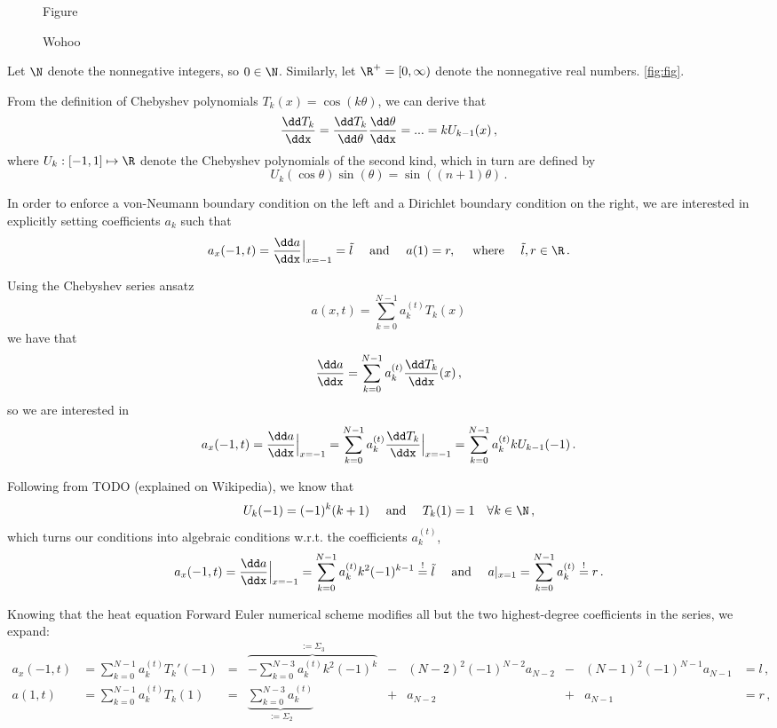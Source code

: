 \documentclass{prettytex/ox/mmsc-special-topic}
\begin{document}
  \pagebreak
  \pagestyle{normal}

  \begin{figure}[H]
    \centering
    Figure
    \caption{Wohoo}
    \label{fig:fig}
  \end{figure}

  Let $\N$ denote the nonnegative integers, so $0 \in \N$.
  Similarly, let $\R^+ = [0, \infty)$ denote the nonnegative real numbers.
  \autoref{fig:fig}.

  From the definition of Chebyshev polynomials $T_k(x) = \cos(k\theta)$, we can derive that
  $$\frac{\dd T_k}{\ddx} = \frac{\dd T_k}{\dd\theta} \frac{\dd\theta}{\ddx} = ... = k U_{k-1}(x)\,,$$
  where $U_k: [-1, 1] \mapsto \R$ denote the Chebyshev polynomials of the second kind, which in turn are defined by
  $$U_k(\cos \theta) \sin(\theta) = \sin\left((n+1) \theta\right)\,.$$

  In order to enforce a von-Neumann boundary condition on the left and a Dirichlet boundary condition on the right,
  we are interested in explicitly setting coefficients $a_k$ such that
  $$a_x(-1, t) = \frac{\dd a}{\ddx}\Big|_{x=-1} = \tilde{l} \quad \text{ and } \quad a(1) = r, \quad \text{ where } \quad \tilde{l}, r \in \R\,.$$

  Using the Chebyshev series ansatz
  $$a(x, t) = \sum_{k=0}^{N-1} a_k^{(t)} T_k(x)$$
  we have that
  $$\frac{\dd a}{\ddx} = \sum_{k=0}^{N-1} a_k^{(t)} \frac{\dd T_k}{\ddx}(x)\,,$$
  so we are interested in
  $$a_x(-1, t) = \frac{\dd a}{\ddx}\Big|_{x=-1} = \sum_{k=0}^{N-1} a_k^{(t)} \frac{\dd T_k}{\ddx}\Big|_{x=-1} = \sum_{k=0}^{N-1} a_k^{(t)} k U_{k-1}(-1)\,.$$

  Following from TODO (explained on Wikipedia), we know that
  $$U_k(-1) = (-1)^k (k+1) \quad \text{ and } \quad T_k(1) = 1 \quad \forall k \in \N\,,$$
  which turns our conditions into algebraic conditions w.r.t. the coefficients $a_k^{(t)}$,
  $$a_x(-1, t) = \frac{\dd a}{\ddx}\Big|_{x=-1} = \sum_{k=0}^{N-1} a_k^{(t)} k^2 (-1)^{k-1} \overset{!}{=} \tilde{l} \quad \text{ and } \quad a|_{x=1} = \sum_{k=0}^{N-1} a_k^{(t)} \overset{!}{=} r\,.$$

  Knowing that the heat equation Forward Euler numerical scheme modifies all but the two highest-degree coefficients in the series, we expand:
  \begin{align*}
    a_x(-1, t) & = \sum_{k=0}^{N-1} a_k^{(t)} T_k'(-1) & = & \overbrace{-\sum_{k=0}^{N-3} a_k^{(t)} k^2 (-1)^{k}}^{:= \Sigma_3} & - & (N-2)^2 (-1)^{N-2} a_{N-2} & - & (N-1)^2 (-1)^{N-1} a_{N-1} & = l\,, \\
    a(1, t)    & = \sum_{k=0}^{N-1} a_k^{(t)} T_k(1)   & = & \underbrace{\sum_{k=0}^{N-3} a_k^{(t)}}_{:= \Sigma_2}              & + & a_{N-2}                    & + & a_{N-1}                    & = r\,,
  \end{align*}
\end{document}
